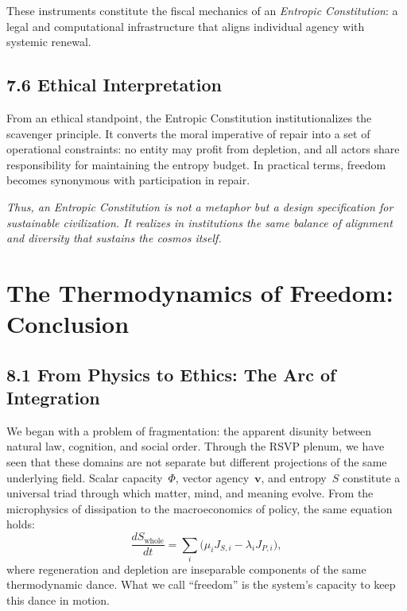 \documentclass[11pt,a4paper,titlepage]{article}
\theoremstyle{definition}
\begin{document}
These instruments constitute the fiscal mechanics of an
\emph{Entropic Constitution}: a legal and computational infrastructure that
aligns individual agency with systemic renewal.

\subsection{7.6 Ethical Interpretation}

From an ethical standpoint, the Entropic Constitution institutionalizes the
scavenger principle.  It converts the moral imperative of repair into a set of
operational constraints: no entity may profit from depletion, and all actors
share responsibility for maintaining the entropy budget.  
In practical terms, freedom becomes synonymous with participation in repair.

\bigskip
\noindent
\textit{Thus, an Entropic Constitution is not a metaphor but a design
specification for sustainable civilization.  It realizes in institutions the
same balance of alignment and diversity that sustains the cosmos itself.}

\section{The Thermodynamics of Freedom: Conclusion}
\label{sec:conclusion}

\subsection{8.1 From Physics to Ethics: The Arc of Integration}

We began with a problem of fragmentation:  
the apparent disunity between natural law, cognition, and social order.
Through the RSVP plenum, we have seen that these domains are not separate but 
different projections of the same underlying field.  
Scalar capacity~$\Phi$, vector agency~$\mathbf{v}$, and entropy~$S$ 
constitute a universal triad through which matter, mind, and meaning evolve.
From the microphysics of dissipation to the macroeconomics of policy, the 
same equation holds:
\begin{equation}
\frac{dS_{\text{whole}}}{dt} = 
  \sum_i \big(\mu_i J_{S,i} - \lambda_i J_{P,i}\big),
\label{eq:final_entropy_balance}
\end{equation}
where regeneration and depletion are inseparable components of the same 
thermodynamic dance.  
What we call “freedom” is the system’s capacity to keep this dance in motion.
\end{document}
